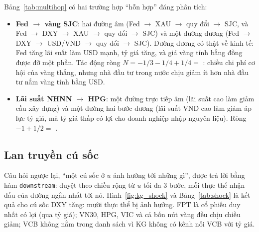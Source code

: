 


Bảng~\ref{tab:multihop} có hai trường hợp ``hỗn hợp'' đáng phân tích:

\begin{itemize}
  \item \textbf{Fed $\to$ vàng SJC}: hai đường âm (Fed $\to$ XAU $\to$ quy đổi $\to$ SJC, và Fed $\to$ DXY $\to$ XAU
        $\to$ quy đổi $\to$ SJC) và một đường dương (Fed $\to$ DXY $\to$ USD/VND $\to$ quy đổi $\to$ SJC). Đường dương
        có thật về kinh tế: Fed tăng lãi suất làm USD mạnh, tỷ giá tăng, và giá vàng tính bằng đồng được đỡ một phần.
        Tác động ròng $N = -1/3 - 1/4 + 1/4 =$ : chiều chi phí cơ hội
        của vàng thắng, nhưng nhà đầu tư trong nước chịu giảm ít hơn nhà đầu tư nắm vàng tính bằng USD.
  \item \textbf{Lãi suất NHNN $\to$ HPG}: một đường trực tiếp âm (lãi suất cao làm giảm cầu xây dựng) và một đường
        hai bước dương (lãi suất VND cao làm giảm áp lực tỷ giá, mà tỷ giá thấp có lợi cho doanh nghiệp nhập nguyên
        liệu). Ròng $-1 + 1/2 =$ .
\end{itemize}

\subsection{Lan truyền cú sốc}
Câu hỏi ngược lại, ``một cú sốc ở $u$ ảnh hưởng tới những gì'', được trả lời bằng hàm \texttt{downstream}: duyệt
theo chiều rộng từ $u$ tối đa 3 bước, mỗi thực thể nhận dấu của đường ngắn nhất tới nó. Hình~\ref{fig:kg_shock} và
Bảng~\ref{tab:shock} là kết quả cho cú sốc DXY tăng: mười thực thể bị ảnh hưởng. FPT là cổ phiếu duy nhất có lợi
(qua tỷ giá); VN30, HPG, VIC và cả bốn nút vàng đều chịu chiều giảm; VCB không nằm trong danh sách vì KG không có
kênh nối VCB với tỷ giá.




